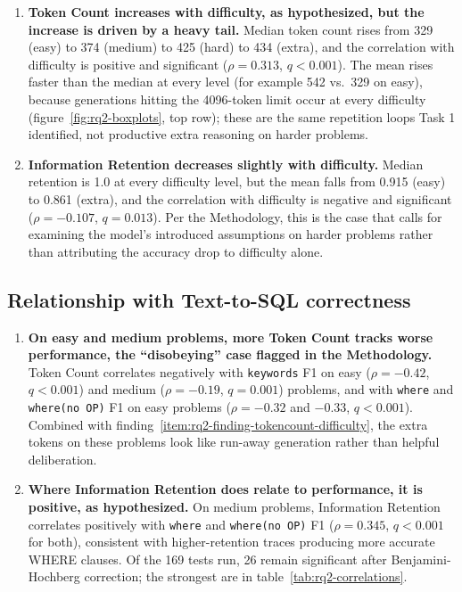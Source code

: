 \begin{enumerate}
\item \label{item:rq2-finding-tokencount-difficulty} \textbf{Token Count increases with difficulty, as hypothesized, but the increase is driven by a heavy tail.} Median token count rises from 329 (easy) to 374 (medium) to 425 (hard) to 434 (extra), and the correlation with difficulty is positive and significant ($\rho=0.313$, $q<0.001$). The mean rises faster than the median at every level (for example 542 vs.\ 329 on easy), because generations hitting the 4096-token limit occur at every difficulty (figure~\ref{fig:rq2-boxplots}, top row); these are the same repetition loops Task 1 identified, not productive extra reasoning on harder problems.
\item \label{item:rq2-finding-retention-difficulty} \textbf{Information Retention decreases slightly with difficulty.} Median retention is 1.0 at every difficulty level, but the mean falls from 0.915 (easy) to 0.861 (extra), and the correlation with difficulty is negative and significant ($\rho=-0.107$, $q=0.013$). Per the Methodology, this is the case that calls for examining the model's introduced assumptions on harder problems rather than attributing the accuracy drop to difficulty alone.
\end{enumerate}

\subsection{Relationship with Text-to-SQL correctness}
\label{sec:rq2-relationship-correctness}

\begin{enumerate}
\item \label{item:rq2-finding-tokencount-disobey} \textbf{On easy and medium problems, more Token Count tracks worse performance, the ``disobeying'' case flagged in the Methodology.} Token Count correlates negatively with \texttt{keywords} F1 on easy ($\rho=-0.42$, $q<0.001$) and medium ($\rho=-0.19$, $q=0.001$) problems, and with \texttt{where} and \texttt{where(no OP)} F1 on easy problems ($\rho=-0.32$ and $-0.33$, $q<0.001$). Combined with finding~\ref{item:rq2-finding-tokencount-difficulty}, the extra tokens on these problems look like run-away generation rather than helpful deliberation.
\item \label{item:rq2-finding-retention-performance} \textbf{Where Information Retention does relate to performance, it is positive, as hypothesized.} On medium problems, Information Retention correlates positively with \texttt{where} and \texttt{where(no OP)} F1 ($\rho=0.345$, $q<0.001$ for both), consistent with higher-retention traces producing more accurate WHERE clauses. Of the 169 tests run, 26 remain significant after Benjamini-Hochberg correction; the strongest are in table~\ref{tab:rq2-correlations}.
\end{enumerate}

